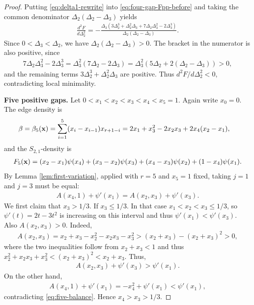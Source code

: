 \documentclass[10pt,a4paper]{article}
\begin{document}
\begin{proof}
Putting \eqref{eq:delta1-rewrite} into \eqref{eq:four-gap-Fpp-before} and taking the common denominator $\Delta_2(\Delta_2-\Delta_3)$ yields
\begin{align}\label{eq:four-second-final}
  \frac{d^2F}{d\Delta_2^2}
  =-\frac{\Delta_3(3\Delta_2^3+\Delta_2^2\Delta_3+7\Delta_2\Delta_3^2-2\Delta_3^3)}{\Delta_2(\Delta_2-\Delta_3)}.
\end{align}
Since $0<\Delta_3<\Delta_2$, we have $\Delta_2(\Delta_2-\Delta_3)>0$.  The bracket in the numerator is also positive, since
\begin{align*}
  7\Delta_2\Delta_3^2-2\Delta_3^3
  =\Delta_3^2(7\Delta_2-2\Delta_3)=\Delta_3^2(5\Delta_2+2(\Delta_2-\Delta_3))>0,
\end{align*}
and the remaining terms $3\Delta_2^3+\Delta_2^2\Delta_3$ are positive.
Thus $d^2F/d\Delta_2^2<0$, contradicting local minimality.

\medskip
\noindent\textbf{Five positive gaps.}
Let $0<x_1<x_2<x_3<x_4<x_5=1$.  Again write $x_0=0$.  The edge density is
\begin{align}
  \beta=\beta_5({\bf x})%
  &=\sum_{i=1}^{5}(x_i-x_{i-1})x_{r+1-i}=2x_1+x_3^2-2x_2x_3+2x_4(x_2-x_1),\label{eq:five-beta}
\end{align}
and the $S_{2,1}$-density is
\begin{align}\label{eq:five-F}
  F_5({\bf x})=(x_2-x_1)\psi(x_4)+(x_3-x_2)\psi(x_3)+(x_4-x_3)\psi(x_2)+(1-x_4)\psi(x_1).
\end{align}
By Lemma \ref{lem:first-variation}, applied with $r=5$ and $x_5=1$ fixed, taking $j=1$ and $j=3$ must be equal:
\begin{align}\label{eq:five-balance}
  A(x_4,1)+\psi'(x_1)=A(x_2,x_3)+\psi'(x_3).
\end{align}
We first claim that $x_3>1/3$. If $x_3\le1/3$.  In that case $x_1<x_2<x_3\le1/3$, so $\psi'(t)=2t-3t^2$ is increasing on this interval and thus $\psi'(x_1)<\psi'(x_3)$.  Also $A(x_2,x_3)>0$.  Indeed,
\begin{align}\label{eq:A23}
  A(x_2,x_3)=x_2+x_3-x_2^2-x_2x_3-x_3^2>(x_2+x_3)-(x_2+x_3)^2>0,
\end{align}
where the two inequalities follow from $x_2+x_3<1$ and thus $x_2^2+x_2x_3+x_3^2<(x_2+x_3)^2<x_2+x_3.$
Thus, 
\begin{align*}
  A(x_2,x_3)+\psi'(x_3)>\psi'(x_1).
\end{align*}
On the other hand,
\begin{align*}
  A(x_4,1)+\psi'(x_1)=-x_4^2+\psi'(x_1)<\psi'(x_1),
\end{align*}
contradicting \eqref{eq:five-balance}.  Hence $x_4>x_3>1/3$.


\end{proof}
\end{document}
